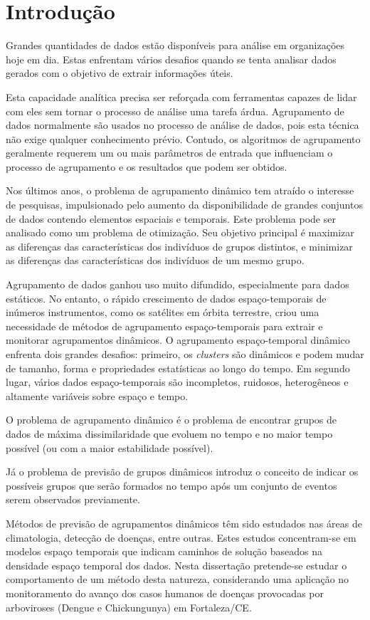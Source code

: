 \chapter{Introdução}
\label{chap:introducao}
Grandes quantidades de dados estão disponíveis para análise em organizações hoje em dia. Estas enfrentam vários desafios quando se tenta analisar dados gerados com o objetivo de extrair informações úteis.

Esta capacidade analítica precisa ser reforçada com ferramentas capazes de lidar com eles sem tornar o processo de análise uma tarefa árdua.
Agrupamento de dados normalmente são usados no processo de análise de dados, pois esta técnica não exige qualquer conhecimento prévio. Contudo, os algoritmos de agrupamento geralmente requerem um ou mais parâmetros de entrada que influenciam o processo de agrupamento e os resultados que podem ser obtidos. 

Nos últimos anos, o problema de agrupamento dinâmico tem atraído o interesse de pesquisas, impulsionado pelo aumento da disponibilidade de grandes conjuntos de dados contendo elementos espaciais e temporais. Este problema pode ser analisado como um problema de otimização. Seu objetivo principal é maximizar as diferenças das características dos indivíduos de grupos distintos, e minimizar as diferenças das características dos indivíduos de um mesmo grupo.

Agrupamento de dados ganhou uso muito difundido, especialmente para dados estáticos. No entanto, o rápido crescimento de dados espaço-temporais de inúmeros instrumentos, como os satélites em órbita terrestre, criou uma necessidade de métodos de agrupamento espaço-temporais para extrair e monitorar agrupamentos dinâmicos. O agrupamento espaço-temporal dinâmico enfrenta dois grandes desafios: primeiro, os \textit{clusters} são dinâmicos e podem mudar de tamanho, forma e propriedades estatísticas ao longo do tempo. Em segundo lugar, vários dados espaço-temporais são incompletos, ruidosos, heterogêneos e altamente variáveis sobre espaço e tempo.


O problema de agrupamento dinâmico é o problema de encontrar grupos de dados de máxima dissimilaridade que evoluem no tempo e no maior tempo possível (ou com a maior estabilidade possível).

Já o problema de previsão de grupos dinâmicos introduz o conceito de indicar os possíveis grupos que serão formados no tempo após um conjunto de eventos serem observados previamente.

Métodos de previsão de agrupamentos dinâmicos têm sido estudados nas áreas de climatologia, detecção de doenças, entre outras. Estes estudos concentram-se em modelos espaço temporais que indicam caminhos de solução baseados na densidade espaço temporal dos dados. Nesta dissertação pretende-se estudar o comportamento de um método desta natureza, considerando uma aplicação no monitoramento do avanço dos casos humanos de doenças provocadas por arboviroses (Dengue e Chickungunya) em Fortaleza/CE.

